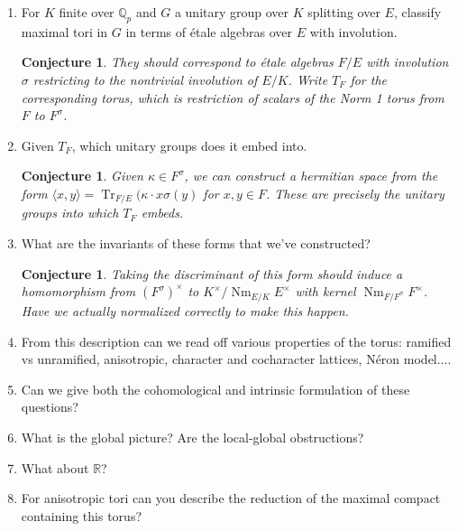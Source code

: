 \documentclass{article}
\theoremstyle{plain}
\newtheorem{conjecture}[theorem]{Conjecture}
\theoremstyle{definition}
\DeclareMathOperator{\Nm}{Nm}
\DeclareMathOperator{\Tr}{Tr}
\newcommand{\RR}{\mathbb{R}}
\newcommand{\Qp}{\mathbb{Q}_p}
\newcommand{\la}{\langle}
\newcommand{\ra}{\rangle}
\begin{document}
\begin{enumerate}

\item For $K$ finite over $\Qp$ and $G$ a unitary group over $K$ splitting over $E$, classify maximal tori in $G$ in terms of \'etale algebras over $E$ with involution.

\begin{conjecture}
They should correspond to \'etale algebras $F / E$ with involution $\sigma$ restricting to the nontrivial involution of $E / K$.  Write $T_F$ for the corresponding torus, which is restriction of scalars of the Norm 1 torus from $F$ to $F^\sigma$.
\end{conjecture}
\item Given $T_F$, which unitary groups does it embed into.

\begin{conjecture}
Given $\kappa \in F^\sigma$, we can construct a hermitian space from the form $\la x, y \ra = \Tr_{F/E}(\kappa \cdot x \sigma(y)$ for $x, y \in F$.  These are precisely the unitary groups into which $T_F$ embeds.
\end{conjecture}

\item What are the invariants of these forms that we've constructed?

\begin{conjecture}
Taking the discriminant of this form should induce a homomorphism from $(F^\sigma)^\times$ to $K^\times / \Nm_{E/K} E^\times$ with kernel $\Nm_{F/F^\sigma} F^\times$.  Have we actually normalized correctly to make this happen.
\end{conjecture}

\item From this description can we read off various properties of the torus: ramified vs unramified, anisotropic, character and cocharacter lattices, N\'eron model....

\item Can we give both the cohomological and intrinsic formulation of these questions?

\item What is the global picture?  Are the local-global obstructions?

\item What about $\RR$?

\item For anisotropic tori can you describe the reduction of the maximal compact containing this torus?

\end{enumerate}
\end{document}
